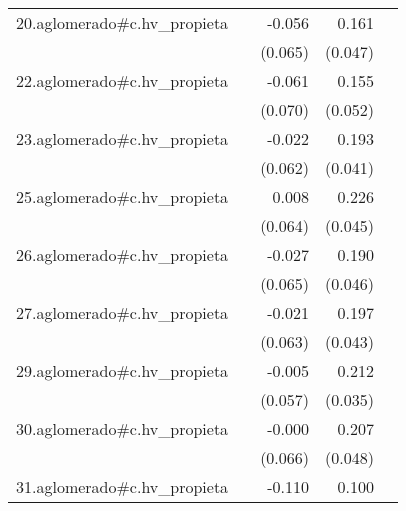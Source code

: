 {\begin{longtable}{l*{4}{D{.}{.}{-1}}}
\addlinespace
20.aglomerado#c.hv\_propieta&                     &      -0.056         &       0.161\sym{***}&                     \\
            &                     &     (0.065)         &     (0.047)         &                     \\
\addlinespace
22.aglomerado#c.hv\_propieta&                     &      -0.061         &       0.155\sym{**} &                     \\
            &                     &     (0.070)         &     (0.052)         &                     \\
\addlinespace
23.aglomerado#c.hv\_propieta&                     &      -0.022         &       0.193\sym{***}&                     \\
            &                     &     (0.062)         &     (0.041)         &                     \\
\addlinespace
25.aglomerado#c.hv\_propieta&                     &       0.008         &       0.226\sym{***}&                     \\
            &                     &     (0.064)         &     (0.045)         &                     \\
\addlinespace
26.aglomerado#c.hv\_propieta&                     &      -0.027         &       0.190\sym{***}&                     \\
            &                     &     (0.065)         &     (0.046)         &                     \\
\addlinespace
27.aglomerado#c.hv\_propieta&                     &      -0.021         &       0.197\sym{***}&                     \\
            &                     &     (0.063)         &     (0.043)         &                     \\
\addlinespace
29.aglomerado#c.hv\_propieta&                     &      -0.005         &       0.212\sym{***}&                     \\
            &                     &     (0.057)         &     (0.035)         &                     \\
\addlinespace
30.aglomerado#c.hv\_propieta&                     &      -0.000         &       0.207\sym{***}&                     \\
            &                     &     (0.066)         &     (0.048)         &                     \\
\addlinespace
31.aglomerado#c.hv\_propieta&                     &      -0.110         &       0.100\sym{*}  &                     \\

\end{longtable}}
